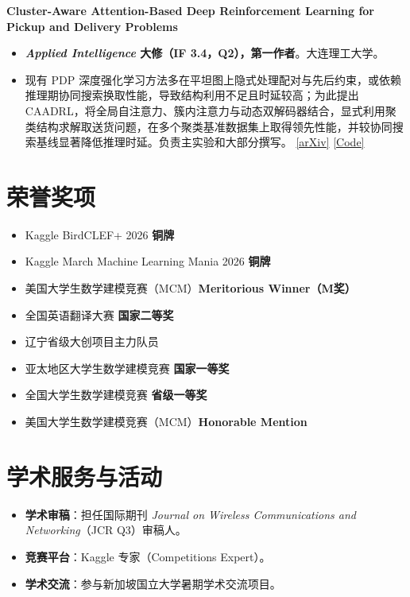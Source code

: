 \documentclass[a4paper,10pt]{ctexart}
\begin{document}
\noindent\textbf{Cluster-Aware Attention-Based Deep Reinforcement Learning for Pickup and Delivery Problems}
\begin{itemize}[leftmargin=1.15em, itemsep=0.02em, topsep=0.03em, parsep=0pt]
    \item \textbf{\textit{Applied Intelligence} 大修（IF 3.4，Q2），第一作者}。大连理工大学。
    \item 现有 PDP 深度强化学习方法多在平坦图上隐式处理配对与先后约束，或依赖推理期协同搜索换取性能，导致结构利用不足且时延较高；为此提出 CAADRL，将全局自注意力、簇内注意力与动态双解码器结合，显式利用聚类结构求解取送货问题，在多个聚类基准数据集上取得领先性能，并较协同搜索基线显著降低推理时延。负责主实验和大部分撰写。 \href{https://arxiv.org/html/2603.10053v1}{[arXiv]} \href{https://github.com/Botwwt/CluPDTSP}{[Code]}
\end{itemize}

\section{荣誉奖项}
\begin{itemize}[leftmargin=1.25em, itemsep=0.025em, topsep=0.05em, parsep=0pt]
    \item {} Kaggle BirdCLEF+ 2026 \textbf{铜牌}
    \item {} Kaggle March Machine Learning Mania 2026 \textbf{铜牌}
    \item {} 美国大学生数学建模竞赛（MCM）\textbf{Meritorious Winner（M奖）}
    \item {} 全国英语翻译大赛 \textbf{国家二等奖}
    \item {} 辽宁省级大创项目主力队员
    \item {} 亚太地区大学生数学建模竞赛 \textbf{国家一等奖}
    \item {} 全国大学生数学建模竞赛 \textbf{省级一等奖}
    \item {} 美国大学生数学建模竞赛（MCM）\textbf{Honorable Mention}
\end{itemize}

\section{学术服务与活动}
\begin{itemize}[leftmargin=1.25em, itemsep=0.025em, topsep=0.05em, parsep=0pt]
    \item \textbf{学术审稿}：担任国际期刊 \textit{Journal on Wireless Communications and Networking}（JCR Q3）审稿人。
    \item \textbf{竞赛平台}：Kaggle 专家（Competitions Expert）。
    \item \textbf{学术交流}：参与新加坡国立大学暑期学术交流项目。
\end{itemize}
\end{document}
